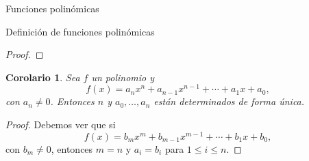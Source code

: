 \documentclass[a4paper,12pt,twoside,spanish,reqno]{amsbook}
\newtheorem{corolario}[teorema]{Corolario}
\theoremstyle{definition}
\theoremstyle{remark}
\newcommand{\K}{\mathbb K}
\begin{document}
\begin{chapter}{Funciones polinómicas}
\begin{section}{Definición de funciones polinómicas}
\begin{proof}
\begin{comment}
            Sea $n >0$. Supongamos que el resultado es cierto para los polinomios de grado  $\le n-1$ (hipótesis inductiva). Si $f$ no tiene raíces, está probado nuestro enunciado. En  caso contrario existe $c_1 \in \K$ tal que $f(c_1) =0$. Por el teorema \ref{th-fact-raiz}, 
            \begin{equation*}
            f(x) = (x-c_1)h_1(x)
            \end{equation*}
            con $h_1$ un polinomio de grado $\le n-1$. Luego, por hipótesis inductiva
            \begin{equation*}
            h_1(x) = (x-d_1)(x-d_2)\cdots(x-d_r)g_r,
            \end{equation*} 
            con $r \le n-1$ y $g_r$ que no tiene raíces. Entonces,
            \begin{equation*}
            f(x) = (x-c_1)(x-d_1)(x-d_2)\cdots(x-d_r)g_r,
            \end{equation*}
            con $r \le n-1$ y $g_r$ que no tiene raíces. Esto es equivalente a (\ref{eq-desc-rai}).   
        \end{comment}
        
    \end{proof}
                        
    \begin{corolario}
        Sea $f$ un polinomio y 
        \begin{equation*}
            f(x) = a_nx^n + a_{n-1}x^{n-1}+\cdots + a_1x +a_0,
        \end{equation*}
        con $a_n \ne 0$.  Entonces $n$ y $a_0,\ldots,a_n$ están determinados de forma única.
    \end{corolario}
    \begin{proof}
        Debemos ver que si 
        \begin{equation*}
        f(x) = b_mx^m + b_{m-1}x^{m-1}+\cdots + b_1x +b_0,
        \end{equation*}
        con $b_m \ne 0$, entonces $m=n$ y $a_i=b_i$ para $1 \le i \le n$. 
        

\end{proof}
\end{section}
\end{chapter}
\end{document}
